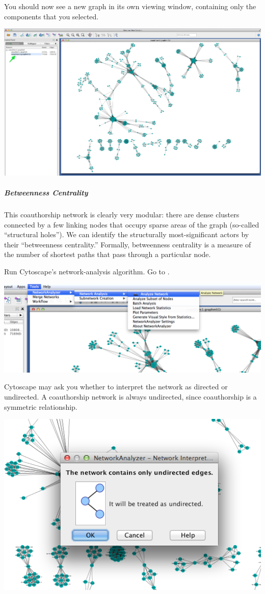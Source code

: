 \documentclass[letterpaper,10pt,english]{sphinxmanual}
\begin{document}
You should now see a new graph in its own viewing window, containing only the components
that you selected.

{\hfill\includegraphics{coauthors.8.png}\hfill}


\subparagraph{Betweenness Centrality}
\label{tutorial.coauthors:betweenness-centrality}
This coauthorship network is clearly very modular: there are dense clusters connected by a
few linking nodes that occupy sparse areas of the graph (so-called ``structural holes''). We
can identify the structurally most-significant actors by their ``betweenness centrality.''
Formally, betweenness centrality is a measure of the number of shortest paths that pass
through a particular node.

Run Cytoscape's network-analysis algorithm. Go to
.

{\hfill\includegraphics{coauthors.9.png}\hfill}

Cytoscape may ask you whether to interpret the network as directed or undirected. A
coauthorship network is always undirected, since coauthorship is a symmetric relationship.

{\hfill\includegraphics{coauthors.10.png}\hfill}
\end{document}
